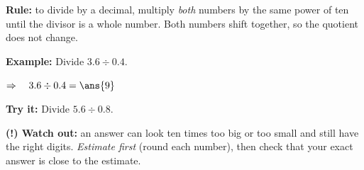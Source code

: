 \documentclass[12pt]{article}
\begin{document}

\begin{formulabox}
\textbf{Rule:} to divide by a decimal, multiply \emph{both} numbers by the
same power of ten until the divisor is a whole number. Both numbers shift
together, so the quotient does not change.
\end{formulabox}

\begin{examplebox}
\textbf{Example:} \quad Divide $3.6 \div 0.4$.

$\Rightarrow\quad 3.6 \div 0.4 = \ans{9}$
\end{examplebox}

\begin{tryitbox}
\textbf{Try it:} \quad Divide $5.6 \div 0.8$.\\[2pt]
\end{tryitbox}

\begin{watchoutbox}
\textbf{(!) Watch out:} an answer can look ten times too big or too small and
still have the right digits. \emph{Estimate first} (round each number), then
check that your exact answer is close to the estimate.
\end{watchoutbox}
\end{document}
